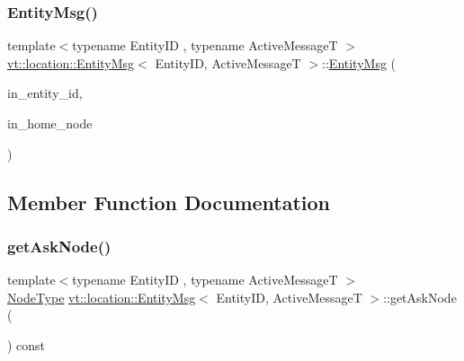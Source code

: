 \subsubsection{\texorpdfstring{Entity\+Msg()}{EntityMsg()}\hspace{0.1cm}{\footnotesize\ttfamily [2/2]}}
{\footnotesize\ttfamily template$<$typename Entity\+ID , typename Active\+MessageT $>$ \\
\hyperlink{structvt_1_1location_1_1_entity_msg}{vt\+::location\+::\+Entity\+Msg}$<$ Entity\+ID, Active\+MessageT $>$\+::\hyperlink{structvt_1_1location_1_1_entity_msg}{Entity\+Msg} (\begin{DoxyParamCaption}\item[{Entity\+ID const \&}]{in\+\_\+entity\+\_\+id,  }\item[{\hyperlink{namespacevt_a866da9d0efc19c0a1ce79e9e492f47e2}{Node\+Type} const \&}]{in\+\_\+home\+\_\+node }\end{DoxyParamCaption})\hspace{0.3cm}{\ttfamily [inline]}}



\subsection{Member Function Documentation}
\mbox{\label{structvt_1_1location_1_1_entity_msg_a5a95c196dd8c41a15988b90bca30a316}} 
\subsubsection{\texorpdfstring{get\+Ask\+Node()}{getAskNode()}}
{\footnotesize\ttfamily template$<$typename Entity\+ID , typename Active\+MessageT $>$ \\
\hyperlink{namespacevt_a866da9d0efc19c0a1ce79e9e492f47e2}{Node\+Type} \hyperlink{structvt_1_1location_1_1_entity_msg}{vt\+::location\+::\+Entity\+Msg}$<$ Entity\+ID, Active\+MessageT $>$\+::get\+Ask\+Node (\begin{DoxyParamCaption}{ }\end{DoxyParamCaption}) const\hspace{0.3cm}{\ttfamily [inline]}}

\mbox{\label{structvt_1_1location_1_1_entity_msg_af288322a731d03cea544bc2e60bb10bd}} 
